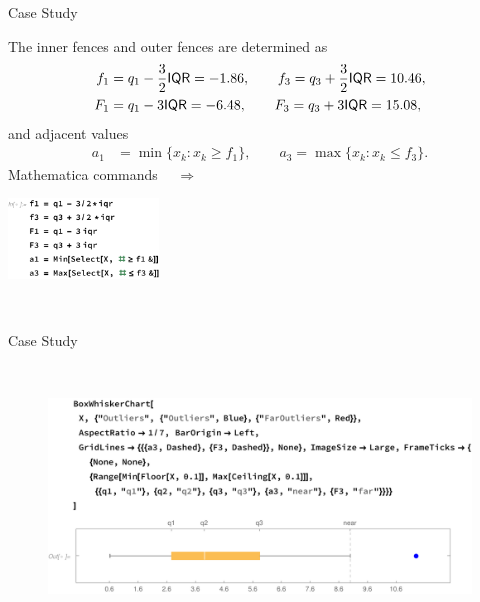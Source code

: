 \begin{frame}{Case Study}

\justifying
{} The inner fences and outer fences are determined as
\begin{align*}
f_1 & = q_1 - \frac{3}{2}\mathsf{IQR} = -1.86, \qquad f_3 = q_3 + \frac{3}{2}\mathsf{IQR} = 10.46, \\
F_1 & = q_1 - 3\mathsf{IQR} = -6.48, \qquad F_3 = q_3 + 3\mathsf{IQR} = 15.08,
\end{align*}
and adjacent values
\begin{align*}
a_1 & = \min\{x_k: x_k \geq f_1 \}, \qquad a_3 = \max\{x_k: x_k\leq f_3 \}.
\end{align*}
Mathematica commands $\quad\Rightarrow$
\begin{minipage}{0.5\linewidth}
	\centering
	\includegraphics[width=4cm]{./images/rc4fig10.pdf}
\end{minipage}\\

\end{frame}


\begin{frame}{Case Study}

\justifying
{} \\
\begin{figure}[htbp]
	\centering
	\includegraphics[width=\linewidth]{./images/rc4fig11.pdf}
\end{figure}

\end{frame}


